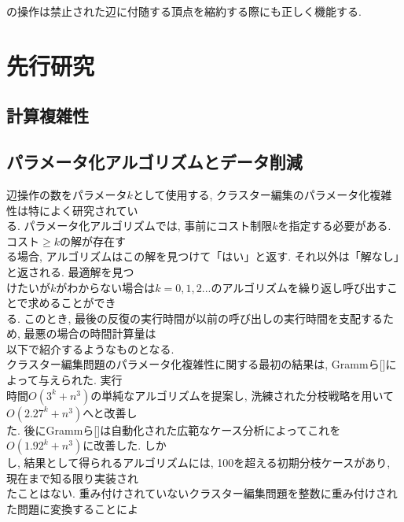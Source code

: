 \documentclass[10.5,a4paper,titlepage]{bxjsarticle}
\begin{document}
の操作は禁止された辺に付随する頂点を縮約する際にも正しく機能する.

\section{先行研究}
\subsection{計算複雑性}
\subsection{パラメータ化アルゴリズムとデータ削減}
辺操作の数をパラメータ$k$として使用する, クラスター編集のパラメータ化複雑性は特によく研究されてい\\

る.
パラメータ化アルゴリズムでは, 事前にコスト制限$k$を指定する必要がある. コスト$\ge k$の解が存在す\\

る場合, アルゴリズムはこの解を見つけて「はい」と返す. それ以外は「解なし」と返される.
最適解を見つ\\

けたいが$k$がわからない場合は$k=0,1,2...$のアルゴリズムを繰り返し呼び出すことで求めることができ\\

る.
このとき, 最後の反復の実行時間が以前の呼び出しの実行時間を支配するため, 最悪の場合の時間計算量は\\

以下で紹介するようなものとなる.\\


クラスター編集問題のパラメータ化複雑性に関する最初の結果は, Grammら[]によって与えられた. 実行\\

時間$O(3^k+n^3)$の単純なアルゴリズムを提案し, 洗練された分枝戦略を用いて$O(2.27^k+n^3)$へと改善し\\

た.
後にGrammら[]は自動化された広範なケース分析によってこれを$O(1.92^k+n^3)$に改善した. しか\\

し, 結果として得られるアルゴリズムには, 100を超える初期分枝ケースがあり, 現在まで知る限り実装され\\

たことはない.
重み付けされていないクラスター編集問題を整数に重み付けされた問題に変換することによ\\
\end{document}
